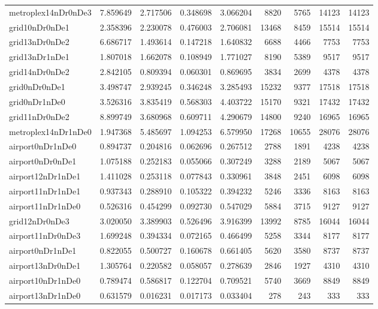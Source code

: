 \begin{longtable}{|l|r|r|r|r|r|r|r|r|}
metroplex14nDr0nDe3 & 7.859649 & 2.717506 & 0.348698 & 3.066204 & 8820 & 5765 & 14123 & 14123 \\
grid10nDr0nDe1 & 2.358396 & 2.230078 & 0.476003 & 2.706081 & 13468 & 8459 & 15514 & 15514 \\
grid13nDr0nDe2 & 6.686717 & 1.493614 & 0.147218 & 1.640832 & 6688 & 4466 & 7753 & 7753 \\
grid13nDr1nDe1 & 1.807018 & 1.662078 & 0.108949 & 1.771027 & 8190 & 5389 & 9517 & 9517 \\
grid14nDr0nDe2 & 2.842105 & 0.809394 & 0.060301 & 0.869695 & 3834 & 2699 & 4378 & 4378 \\
grid0nDr0nDe1 & 3.498747 & 2.939245 & 0.346248 & 3.285493 & 15232 & 9377 & 17518 & 17518 \\
grid0nDr1nDe0 & 3.526316 & 3.835419 & 0.568303 & 4.403722 & 15170 & 9321 & 17432 & 17432 \\
grid11nDr0nDe2 & 8.899749 & 3.680968 & 0.609711 & 4.290679 & 14800 & 9240 & 16965 & 16965 \\
metroplex14nDr1nDe0 & 1.947368 & 5.485697 & 1.094253 & 6.579950 & 17268 & 10655 & 28076 & 28076 \\
airport0nDr1nDe0 & 0.894737 & 0.204816 & 0.062696 & 0.267512 & 2788 & 1891 & 4238 & 4238 \\
airport0nDr0nDe1 & 1.075188 & 0.252183 & 0.055066 & 0.307249 & 3288 & 2189 & 5067 & 5067 \\
airport12nDr1nDe1 & 1.411028 & 0.253118 & 0.077843 & 0.330961 & 3848 & 2451 & 6098 & 6098 \\
airport11nDr1nDe1 & 0.937343 & 0.288910 & 0.105322 & 0.394232 & 5246 & 3336 & 8163 & 8163 \\
airport11nDr1nDe0 & 0.526316 & 0.454299 & 0.092730 & 0.547029 & 5884 & 3715 & 9127 & 9127 \\
grid12nDr0nDe3 & 3.020050 & 3.389903 & 0.526496 & 3.916399 & 13992 & 8785 & 16044 & 16044 \\
airport11nDr0nDe3 & 1.699248 & 0.394334 & 0.072165 & 0.466499 & 5258 & 3344 & 8177 & 8177 \\
airport0nDr1nDe1 & 0.822055 & 0.500727 & 0.160678 & 0.661405 & 5620 & 3580 & 8737 & 8737 \\
airport13nDr0nDe1 & 1.305764 & 0.220582 & 0.058057 & 0.278639 & 2846 & 1927 & 4310 & 4310 \\
airport10nDr1nDe0 & 0.789474 & 0.586817 & 0.122704 & 0.709521 & 5740 & 3669 & 8849 & 8849 \\
airport13nDr1nDe0 & 0.631579 & 0.016231 & 0.017173 & 0.033404 & 278 & 243 & 333 & 333 \\

\end{longtable}
